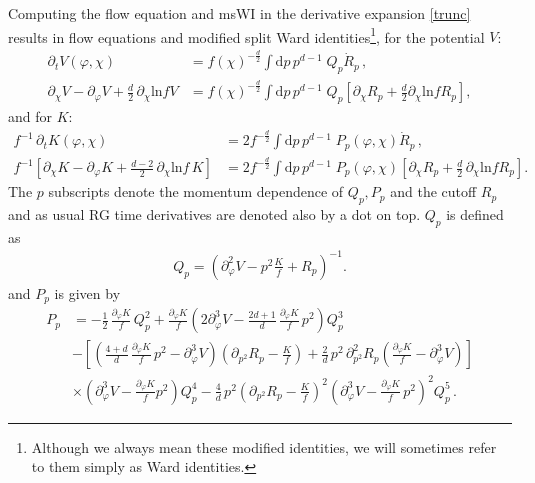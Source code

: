 \documentclass[11pt]{book} %
\numberwithin{equation}{chapter}
\begin{document}
Computing the flow equation and msWI in the derivative expansion \eqref{trunc} results in flow equations
and modified split Ward identities\footnote{Although we always mean these modified identities,
we will sometimes refer to them  simply as Ward identities.}, for the potential $V$:
\begin{align}
  \label{flowV}
  \partial_t V(\varphi,\chi)
  &= f(\chi)^{-\frac{d}{2}} \int \mathrm dp\, p^{d-1} \; Q_p \dot R_p \,, \\
  \label{msWIV}
  \partial_\chi V - \partial_\varphi V + \frac{d}{2} \, \partial_\chi \text{ln} f V
  &= f(\chi)^{-\frac{d}{2}} \int \mathrm dp\, p^{d-1} \; Q_p
  \left[
    \partial_\chi R_p + \frac{d}{2}\partial_\chi \text{ln} f  R_p
  \right] ,
\end{align}
and for $K$:
\begin{align}
  \label{flowK}
  f^{-1} \, \partial_t K(\varphi,\chi)
  &= 2 f^{-\frac{d}{2}} \int \mathrm dp \, p^{d-1} \; P_p(\varphi,\chi)\dot R_p \,,\\
  \label{msWIK}
  f^{-1}
  \left[
    \partial_\chi K- \partial_\varphi K + \frac{d-2}{2} \, \partial_\chi \text{ln}f \, K
  \right]
  &= 2 f^{-\frac{d}{2}} \int \mathrm dp \, p^{d-1} \; P_p(\varphi,\chi)
  \left[
    \partial_{\chi} R_p + \frac{d}{2} \, \partial_\chi \mathrm{ln} f R_p
  \right].
\end{align}
The $p$ subscripts denote the momentum dependence of $Q_p, P_p$ and the cutoff $R_p$ and as
usual RG time derivatives are denoted also by a dot on top. $Q_p$ is defined as
\begin{align}
	Q_p = \left( \partial^2_\varphi V - p^2\frac{K}{f} + R_p \right)^{-1}.
	\label{Q}
\end{align}
and $P_p$ is given by
\begin{align}
	P_p &= - \frac{1}{2} \, \frac{\partial_\varphi K}{f} \, Q_p^2
	+ \frac{\partial_\varphi K}{f}
  \left(
    2 \partial_\varphi^3 V
    - \frac{2d+1}{d} \, \frac{\partial_{\varphi}K}{f} \, p^2
  \right) Q_p^3 \nonumber \\
  & -
  \left[
    \left(
      \frac{4+d}{d} \, \frac{\partial_\varphi K}{f} \, p^2
      - \partial^3_\varphi V
    \right)
    \left(
      \partial_{p^2} R_p - \frac{K}{f}
    \right)
    + \frac{2}{d} \, p^2 \, \partial^2_{p^2} R_p
    \left(
      \frac{\partial_\varphi K}{f} - \partial_\varphi^3 V
    \right)
  \right] \nonumber \\
  & \times \left(\partial_\varphi^3 V - \frac{\partial_\varphi K}{f}p^2\right)Q_p^4
  -\frac{4}{d} \, p^2
  \left(
    \partial_{p^2}R_p-\frac{K}{f}
  \right)^2
  \left(
    \partial_\varphi^3 V - \frac{\partial_\varphi K}{f} \, p^2
  \right)^2 Q_p^5 \,.
\end{align}
\end{document}
